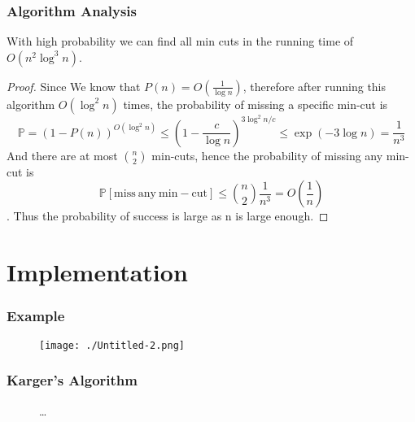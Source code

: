 \documentclass[compress,blue]{beamer}
\begin{document}
	\begin{frame}[c]
	\frametitle{Algorithm Analysis}
	\begin{theorem}
		With high probability we can find all min cuts in the running time of $ O(n^2 \log^3n) $.
	\end{theorem}
	\begin{proof}
		Since We know that $ P(n)=O(\frac{1}{\log n}) $, therefore after running this algorithm $ O(\log^2 n) $ times, the probability of missing a specific min-cut is \[ \mathbb{P}=(1-P(n))^{O(\log^2n)} \leq (1-\frac{c}{\log n})^{3\log^2 n/c} \leq \exp(-3\log n) = \frac{1}{n^3} \]
		And there are at most $ {n \choose 2} $ min-cuts, hence the probability of missing any min-cut is\[ \mathbb{P}[\mathrm{miss\ any\ min-cut}] \leq {n \choose 2}\frac{1}{n^3} = O(\frac{1}{n}) \].
		Thus the probability of success is large as n is large enough.
	\end{proof}
	\end{frame}
	
\section{Implementation}
	\begin{frame}[c]
	\frametitle{Example}
	\begin{figure}[h]
		\centering
		\texttt{[image: ./Untitled-2.png]}
		\label{fig:200-vertices simple graph}
	\end{figure}

	\end{frame}
	
	\begin{frame}[c]
	\frametitle{Karger's Algorithm}
	\begin{figure}
	\centering
	\tiny
	\lstset{language=python}
		
	\dots
	\lstset{language=python}
			
	\end{figure}
	\end{frame}
	
\end{document}
